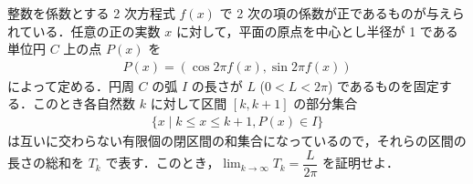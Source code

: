 \documentclass[../../main.tex]{subfiles}
\begin{document}
整数を係数とする 2 次方程式 $f(x)$ で 2 次の項の係数が正であるものが与えられている．任意の正の実数 $x$ に対して，平面の原点を中心とし半径が 1 である単位円 $C$ 上の点 $P(x)$ を
\begin{align}
  P(x) = (\cos 2\pi f(x), \sin 2\pi f(x))
\end{align}
によって定める．円周 $C$ の弧 $I$ の長さが $L$ ($0 < L < 2\pi$) であるものを固定する．このとき各自然数 $k$ に対して区間 $[k, k+1]$ の部分集合
\begin{align}
  \{x \mid k \le x \le k+1, P(x) \in I \}
\end{align}
は互いに交わらない有限個の閉区間の和集合になっているので，それらの区間の長さの総和を $T_k$ で表す．このとき，$\lim_{k \to \infty} T_k = \dfrac{L}{2\pi}$ を証明せよ．
\end{document}
